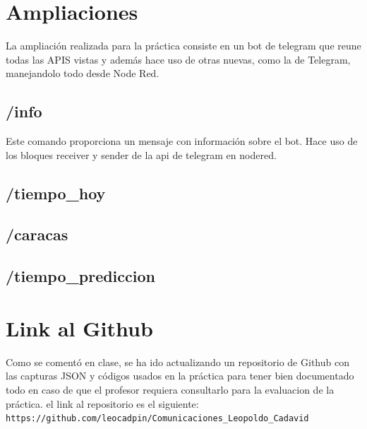 \documentclass[12pt]{article}
\begin{document}
\section{Ampliaciones}

La ampliación realizada para la práctica consiste en un bot de telegram que reune todas las APIS vistas y además hace uso de otras nuevas, como la de Telegram, 
manejandolo todo desde Node Red. \\

\subsection{/info}

Este comando proporciona un mensaje con información sobre el bot. Hace uso de
los bloques receiver y sender de la api de telegram
en nodered.

\subsection{/tiempo\_hoy}

\subsection{/caracas}

\subsection{/tiempo\_prediccion}

\section{Link al Github}
Como se comentó en clase, se ha ido actualizando un repositorio de Github con las capturas JSON y códigos usados en la práctica para tener bien documentado todo en caso de que el profesor
requiera consultarlo para la evaluacion de la práctica. el link al repositorio es el siguiente:\\

\verb|https://github.com/leocadpin/Comunicaciones_Leopoldo_Cadavid|
\end{document}
